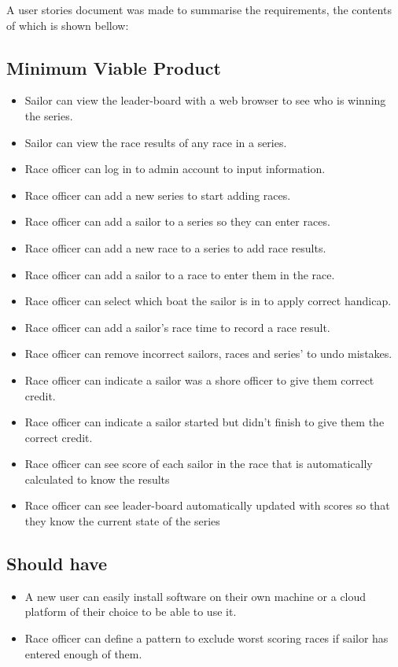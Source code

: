 \documentclass{l4proj}
\begin{document}
A user stories document was made to summarise the requirements, the contents of which is shown bellow:
\subsection{Minimum Viable Product}
\begin{itemize}
    \item
    Sailor can view the leader-board with a web browser to see who is winning the series.
    \item
    Sailor can view the race results of any race in a series.
    \item
    Race officer can log in to admin account to input information.
    \item
    Race officer can add a new series to start adding races.
    \item
    Race officer can add a sailor to a series so they can enter races.
    \item
    Race officer can add a new race to a series to add race results.
    \item
    Race officer can add a sailor to a race to enter them in the race.
    \item
    Race officer can select which boat the sailor is in to apply
    correct handicap.
    \item
    Race officer can add a sailor’s race time to record a race result.
    \item
    Race officer can remove incorrect sailors, races and series’ to undo mistakes.
    \item
    Race officer can indicate a sailor was a shore officer to give them correct credit.
    \item
    Race officer can indicate a sailor started but didn't finish to give them the correct credit.
    \item
    Race officer can see score of each sailor in the race that is automatically calculated to know the results
    \item
    Race officer can see leader-board automatically updated with scores so that they know the current state of the series
\end{itemize}

\subsection{Should have}

\begin{itemize}
    \item
    A new user can easily install software on their own machine or a cloud platform of their choice to be able to use it.
    \item
    Race officer can define a pattern to exclude worst scoring races if sailor has entered enough of them.
\end{itemize}
\end{document}
